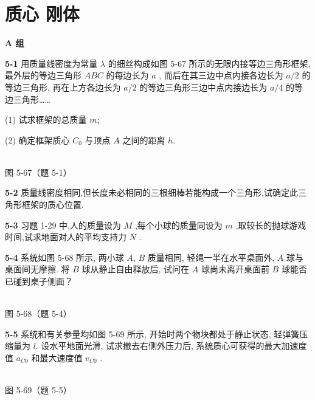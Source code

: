\chapter{质心 刚体}
\begin{center}\textbf{A 组}\end{center}

\textbf{5-1} 用质量线密度为常量 $\lambda$ 的细丝构成如图 5-67 所示的无限内接等边三角形框架, 最外层的等边三角形 $ABC$ 的每边长为 $a$ , 而后在其三边中点内接各边长为 $a / 2$ 的等边三角形, 再在上方各边长为 $a / 2$ 的等边三角形三边中点内接边长为 $a / 4$ 的等边三角形……

(1) 试求框架的总质量 $m$;

(2) 确定框架质心 $C_{0}$ 与顶点 $A$ 之间的距离 $h$.

\begin{center}
\resizebox{0.50\textwidth}{!}{}\\[4pt]
{\small 图 5-67（题 5-1）}
\end{center}

\newpage

\textbf{5-2} 质量线密度相同,但长度未必相同的三根细棒若能构成一个三角形,试确定此三角形框架的质心位置.

\newpage

\textbf{5-3} 习题 1-29 中,人的质量设为 $M$ ,每个小球的质量同设为 $m$ ,取较长的抛球游戏时间,试求地面对人的平均支持力 $\overline{N}$ .

\newpage

\textbf{5-4} 系统如图 5-68 所示, 两小球 $A$, $B$ 质量相同, 轻绳一半在水平桌面外, $A$ 球与桌面间无摩擦. 将 $B$ 球从静止自由释放后, 试问在 $A$ 球尚未离开桌面前 $B$ 球能否已碰到桌子侧面？

\begin{center}
\resizebox{0.45\textwidth}{!}{}\\[4pt]
{\small 图 5-68（题 5-4）}
\end{center}

\newpage

\textbf{5-5} 系统和有关参量均如图 5-69 所示, 开始时两个物块都处于静止状态, 轻弹簧压缩量为 $l$. 设水平地面光滑, 试求撤去右侧外压力后, 系统质心可获得的最大加速度值 $a_{C0}$ 和最大速度值 $v_{C0}$ .

\begin{center}
\resizebox{0.49\textwidth}{!}{}\\[4pt]
{\small 图 5-69（题 5-5）}
\end{center}


